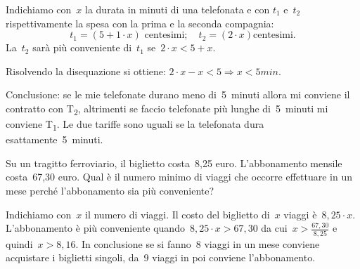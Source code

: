  \begin{soluzione}
 Indichiamo con~$x$ la durata in minuti di una telefonata e con
$t_{1}$ e~$t_{2}$ rispettivamente la spesa con
la prima e la seconda compagnia:
\[t_{1}=(5+1\cdot x)\text{ centesimi};\quad t_{2}=(2\cdot x)\text{
centesimi.}\]
La~$t_2$ sarà più conveniente di~$t_1$ se~$2\cdot x<5+x$.

Risolvendo la disequazione si ottiene:
$2\cdot x-x<5\Rightarrow x<5\unit{min}$.

Conclusione: se le mie telefonate durano meno di~5~minuti allora mi
conviene il contratto con T\textsubscript{2}, altrimenti se faccio
telefonate più lunghe di~5~minuti mi conviene T\textsubscript{1}. Le
due tariffe sono uguali se la telefonata dura esattamente~5~minuti.
 \end{soluzione}

 \begin{problema}[L'abbonamento]
 Su un tragitto ferroviario, il biglietto costa~8,25 euro.
L'abbonamento mensile costa~67,30 euro. Qual è il
numero minimo di viaggi che occorre effettuare in un mese perché
l'abbonamento sia più conveniente?
 \end{problema}

 \begin{soluzione}
 Indichiamo con~$x$ il numero di viaggi. Il costo del biglietto di~$x$
viaggi è~$8,25\cdot x$. L'abbonamento è più
conveniente quando~$8,25\cdot x>67,30$ da cui~$x>\frac{67,30}{8,25}$
e quindi~$x>8,16$. In conclusione se si fanno~8 viaggi in un
mese conviene acquistare i biglietti singoli, da~9 viaggi in poi
conviene l'abbonamento.
 \end{soluzione}




